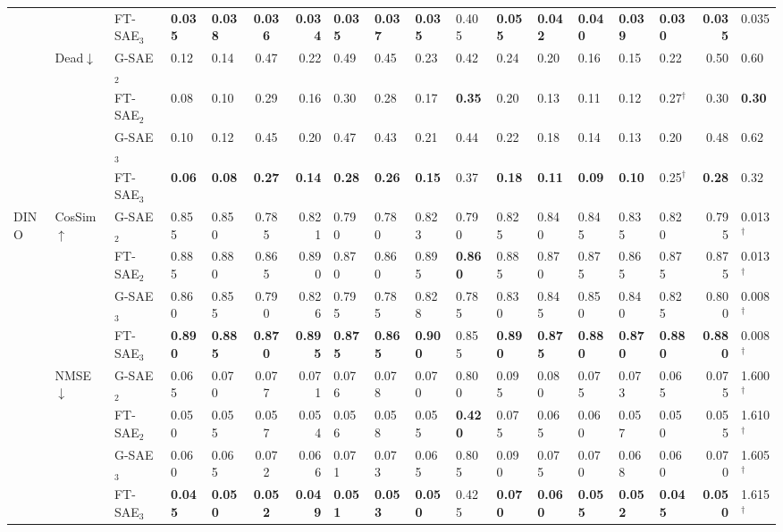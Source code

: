 \begin{table}[tbp]
{\begin{tabular}{lll A B C D E F G H I J K L M N O}
  & & FT-SAE$_3$ & \bf0.035 & \bf0.038 & \bf0.036 & \bf0.034 & \bf0.035 & \bf0.037 & \bf0.035 & 0.405 & \bf0.055 & \bf0.042 & \bf0.040 & \bf0.039 & \bf0.030 & \bf0.035 & 0.035 \\
  \cmidrule(l){2-18}
  & Dead$\downarrow$
    & G-SAE$_2$  & 0.12 & 0.14 & 0.47 & 0.22 & 0.49 & 0.45 & 0.23 & 0.42 & 0.24 & 0.20 & 0.16 & 0.15 & 0.22 & 0.50 & 0.60 \\
  & & FT-SAE$_2$ & 0.08 & 0.10 & 0.29 & 0.16 & 0.30 & 0.28 & 0.17 & \bf0.35 & 0.20 & 0.13 & 0.11 & 0.12 & 0.27$^\dagger$ & 0.30 & \bf0.30 \\
  & & G-SAE$_3$  & 0.10 & 0.12 & 0.45 & 0.20 & 0.47 & 0.43 & 0.21 & 0.44 & 0.22 & 0.18 & 0.14 & 0.13 & 0.20 & 0.48 & 0.62 \\
  & & FT-SAE$_3$ & \bf0.06 & \bf0.08 & \bf0.27 & \bf0.14 & \bf0.28 & \bf0.26 & \bf0.15 & 0.37 & \bf0.18 & \bf0.11 & \bf0.09 & \bf0.10 & 0.25$^\dagger$ & \bf0.28 & 0.32 \\
\midrule
DINO
  & CosSim$\uparrow$
    & G-SAE$_2$  & 0.855 & 0.850 & 0.785 & 0.821 & 0.790 & 0.780 & 0.823 & 0.790 & 0.825 & 0.840 & 0.845 & 0.835 & 0.820 & 0.795 & 0.013$^\dagger$ \\
  & & FT-SAE$_2$ & 0.885 & 0.880 & 0.865 & 0.890 & 0.870 & 0.860 & 0.895 & \bf0.860 & 0.885 & 0.870 & 0.875 & 0.865 & 0.875 & 0.875 & 0.013$^\dagger$ \\
  & & G-SAE$_3$  & 0.860 & 0.855 & 0.790 & 0.826 & 0.795 & 0.785 & 0.828 & 0.785 & 0.830 & 0.845 & 0.850 & 0.840 & 0.825 & 0.800 & 0.008$^\dagger$ \\
  & & FT-SAE$_3$ & \bf0.890 & \bf0.885 & \bf0.870 & \bf0.895 & \bf0.875 & \bf0.865 & \bf0.900 & 0.855 & \bf0.890 & \bf0.875 & \bf0.880 & \bf0.870 & \bf0.880 & \bf0.880 & 0.008$^\dagger$ \\
  \cmidrule(l){2-18}
  & NMSE$\downarrow$
    & G-SAE$_2$  & 0.065 & 0.070 & 0.077 & 0.071 & 0.076 & 0.078 & 0.070 & 0.800 & 0.095 & 0.080 & 0.075 & 0.073 & 0.065 & 0.075 & 1.600$^\dagger$ \\
  & & FT-SAE$_2$ & 0.050 & 0.055 & 0.057 & 0.054 & 0.056 & 0.058 & 0.055 & \bf0.420 & 0.075 & 0.065 & 0.060 & 0.057 & 0.050 & 0.055 & 1.610$^\dagger$ \\
  & & G-SAE$_3$  & 0.060 & 0.065 & 0.072 & 0.066 & 0.071 & 0.073 & 0.065 & 0.805 & 0.090 & 0.075 & 0.070 & 0.068 & 0.060 & 0.070 & 1.605$^\dagger$ \\
  & & FT-SAE$_3$ & \bf0.045 & \bf0.050 & \bf0.052 & \bf0.049 & \bf0.051 & \bf0.053 & \bf0.050 & 0.425 & \bf0.070 & \bf0.060 & \bf0.055 & \bf0.052 & \bf0.045 & \bf0.050 & 1.615$^\dagger$ \\

\end{tabular}}
\end{table}
